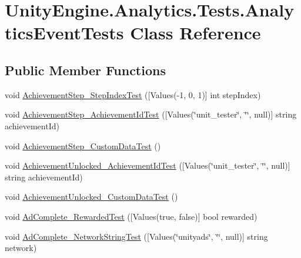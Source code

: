 \hypertarget{class_unity_engine_1_1_analytics_1_1_tests_1_1_analytics_event_tests}{}\section{Unity\+Engine.\+Analytics.\+Tests.\+Analytics\+Event\+Tests Class Reference}
\label{class_unity_engine_1_1_analytics_1_1_tests_1_1_analytics_event_tests}
\subsection*{Public Member Functions}
\begin{DoxyCompactItemize}
\item 
void \mbox{\hyperlink{class_unity_engine_1_1_analytics_1_1_tests_1_1_analytics_event_tests_a4dc485a728d432a20516c87e59f90aa0}{Achievement\+Step\+\_\+\+Step\+Index\+Test}} (\mbox{[}Values(-\/1, 0, 1)\mbox{]} int step\+Index)
\item 
void \mbox{\hyperlink{class_unity_engine_1_1_analytics_1_1_tests_1_1_analytics_event_tests_a022f6521e7acfaae4e01f50483d69daa}{Achievement\+Step\+\_\+\+Achievement\+Id\+Test}} (\mbox{[}Values(\char`\"{}unit\+\_\+tester\char`\"{}, \char`\"{}\char`\"{}, null)\mbox{]} string achievement\+Id)
\item 
void \mbox{\hyperlink{class_unity_engine_1_1_analytics_1_1_tests_1_1_analytics_event_tests_aad2b15862bbae50c4b290afad988c79f}{Achievement\+Step\+\_\+\+Custom\+Data\+Test}} ()
\item 
void \mbox{\hyperlink{class_unity_engine_1_1_analytics_1_1_tests_1_1_analytics_event_tests_a78756ad2d8aeac3be1dc5e13df90eea2}{Achievement\+Unlocked\+\_\+\+Achievement\+Id\+Test}} (\mbox{[}Values(\char`\"{}unit\+\_\+tester\char`\"{}, \char`\"{}\char`\"{}, null)\mbox{]} string achievement\+Id)
\item 
void \mbox{\hyperlink{class_unity_engine_1_1_analytics_1_1_tests_1_1_analytics_event_tests_af5392c936f633266dd9ab88558762d35}{Achievement\+Unlocked\+\_\+\+Custom\+Data\+Test}} ()
\item 
void \mbox{\hyperlink{class_unity_engine_1_1_analytics_1_1_tests_1_1_analytics_event_tests_aebe1d997c10b9f83e29344568bd79012}{Ad\+Complete\+\_\+\+Rewarded\+Test}} (\mbox{[}Values(true, false)\mbox{]} bool rewarded)
\item 
void \mbox{\hyperlink{class_unity_engine_1_1_analytics_1_1_tests_1_1_analytics_event_tests_a2b55ac29017166f3861ac9b6948745be}{Ad\+Complete\+\_\+\+Network\+String\+Test}} (\mbox{[}Values(\char`\"{}unityads\char`\"{}, \char`\"{}\char`\"{}, null)\mbox{]} string network)

\end{DoxyCompactItemize}
